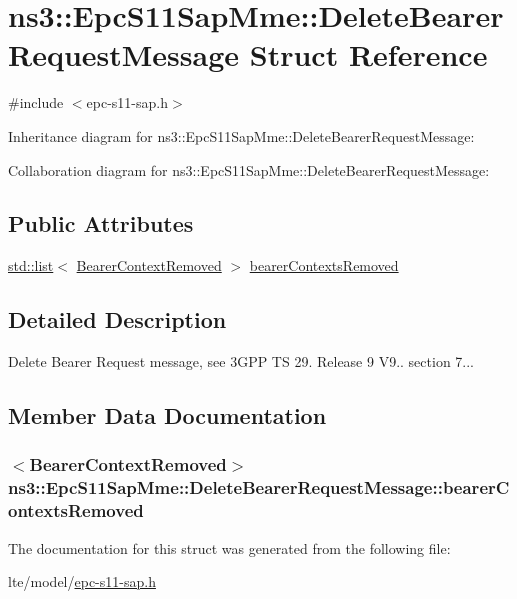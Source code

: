 \hypertarget{structns3_1_1EpcS11SapMme_1_1DeleteBearerRequestMessage}{}\section{ns3\+:\+:Epc\+S11\+Sap\+Mme\+:\+:Delete\+Bearer\+Request\+Message Struct Reference}
\label{structns3_1_1EpcS11SapMme_1_1DeleteBearerRequestMessage}


{\ttfamily \#include $<$epc-\/s11-\/sap.\+h$>$}



Inheritance diagram for ns3\+:\+:Epc\+S11\+Sap\+Mme\+:\+:Delete\+Bearer\+Request\+Message\+:


Collaboration diagram for ns3\+:\+:Epc\+S11\+Sap\+Mme\+:\+:Delete\+Bearer\+Request\+Message\+:
\subsection*{Public Attributes}
\begin{DoxyCompactItemize}
\item 
\hyperlink{openflow-interface_8h_afd9bcfa176617760671b67580f536fa7}{std\+::list}$<$ \hyperlink{structns3_1_1EpcS11SapMme_1_1BearerContextRemoved}{Bearer\+Context\+Removed} $>$ \hyperlink{structns3_1_1EpcS11SapMme_1_1DeleteBearerRequestMessage_a89ca710e29bb5b53ecb965ba82393865}{bearer\+Contexts\+Removed}
\end{DoxyCompactItemize}


\subsection{Detailed Description}
Delete Bearer Request message, see 3\+G\+PP TS 29. Release 9 V9.. section 7... 

\subsection{Member Data Documentation}
\subsubsection[{\texorpdfstring{bearer\+Contexts\+Removed}{bearerContextsRemoved}}]{$<${\bf Bearer\+Context\+Removed}$>$ ns3\+::\+Epc\+S11\+Sap\+Mme\+::\+Delete\+Bearer\+Request\+Message\+::bearer\+Contexts\+Removed}\hypertarget{structns3_1_1EpcS11SapMme_1_1DeleteBearerRequestMessage_a89ca710e29bb5b53ecb965ba82393865}{}\label{structns3_1_1EpcS11SapMme_1_1DeleteBearerRequestMessage_a89ca710e29bb5b53ecb965ba82393865}


The documentation for this struct was generated from the following file\+:\begin{DoxyCompactItemize}
\item 
lte/model/\hyperlink{epc-s11-sap_8h}{epc-\/s11-\/sap.\+h}\end{DoxyCompactItemize}
